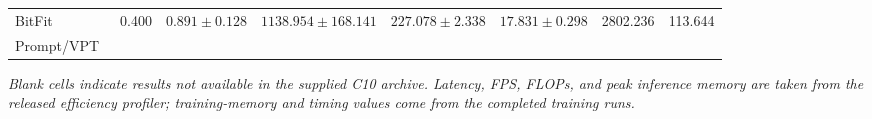 \documentclass[pdflatex,sn-mathphys-num]{sn-jnl}
\theoremstyle{thmstyleone}
\theoremstyle{thmstyletwo}
\theoremstyle{thmstylethree}
\begin{document}
\begin{table}[!htbp]
{\begin{tabular}{@{}lrrrrrrr@{}}
BitFit~\cite{zaken2022bitfit} & 0.400 & $0.891\pm0.128$ & $1138.954\pm168.141$ & $227.078\pm2.338$ & $17.831\pm0.298$ & 2802.236 & 113.644 \\
Prompt/VPT~\cite{jia2022vpt} &  &  &  &  &  &  & \\
\bottomrule
\end{tabular}%
}
\vspace{2pt}
{\footnotesize\textit{Blank cells indicate results not available in the supplied C10 archive. Latency, FPS, FLOPs, and peak inference memory are taken from the released efficiency profiler; training-memory and timing values come from the completed training runs.}}
\end{table}

\begin{table}[!htbp]
\centering
\caption{Current three-seed accuracy, parameter, and storage results on Oxford-IIIT Pet with EfficientNet-B0 trained for 100 epochs using batch size 64. The supplied C11 archive is partial: only Linear probing and BitFit contain complete final results for seeds $\{0,1,2\}$. Values that vary across seeds are reported as mean $\pm$ sample standard deviation; incomplete method rows remain blank.}
\label{tab:pet_effb0_100}
\scriptsize
\setlength{\tabcolsep}{3.2pt}
\renewcommand{\arraystretch}{1.10}
\end{table}
\end{document}
